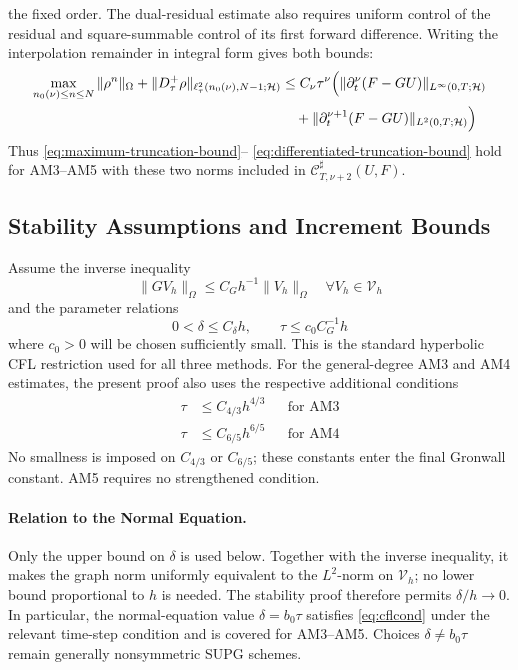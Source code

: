 \documentclass[11pt]{article}
\begin{document}
the fixed order. The dual-residual estimate also requires uniform control of
the residual and square-summable control of its first forward difference.
Writing the interpolation remainder in integral form gives both bounds:
\begin{align}
\max_{n_0(\nu)\le n\le N}\|\rho^n\|_{\Omega}
+\|D_{\tau}^{+}\rho\|_{
\ell_{\tau}^2(n_0(\nu),N-1;\mathcal H)}
&\le C_\nu\tau^\nu\Bigl(
\|\partial_t^\nu(F-GU)\|_{L^{\infty}(0,T;\mathcal H)}
\label{eq:am-differentiated-consistency-main}\\
&\quad+\|\partial_t^{\nu+1}(F-GU)\|_{L^2(0,T;\mathcal H)}\Bigr)
\label{eq:am-differentiated-consistency-derivative}
\end{align}
Thus \eqref{eq:maximum-truncation-bound}--
\eqref{eq:differentiated-truncation-bound} hold for AM3--AM5 with these
two norms included in \(\mathcal C^{\sharp}_{T,\nu+2}(U,F)\).


\subsection{Stability Assumptions and Increment Bounds}
\label{subsec:adams-stability-assumptions}
Assume the inverse inequality
\begin{equation}
\|GV_h\|_{\Omega}\le C_Gh^{-1}\|V_h\|_{\Omega}
\quad \forall V_h\in\mathcal V_h \label{eq:adams-inverse-inequality}
\end{equation}
and the parameter relations
\begin{equation}
0<\delta\le C_{\delta}h,\qquad
\tau\le c_0C_G^{-1}h \label{eq:cflcond}
\end{equation}
where \(c_0>0\) will be chosen sufficiently small. This is the standard
hyperbolic CFL restriction used for all three methods. For the general-degree
AM3 and AM4 estimates, the present proof also uses the respective additional
conditions
\begin{align}
\tau&\le C_{4/3}h^{4/3} &&\text{for AM3} \label{eq:am3-strengthened-cfl}\\
\tau&\le C_{6/5}h^{6/5} &&\text{for AM4} \label{eq:am4-strengthened-cfl}
\end{align}
No smallness is imposed on \(C_{4/3}\) or \(C_{6/5}\); these constants enter
the final Gronwall constant. AM5 requires no strengthened condition.

\paragraph{Relation to the Normal Equation.}
Only the upper bound on \(\delta\) is used below. Together with the inverse
inequality, it makes the graph norm uniformly equivalent to the
\(L^2\)-norm on \(\mathcal V_h\); no lower bound proportional to \(h\) is
needed. The stability proof therefore permits \(\delta/h\to0\). In
particular, the normal-equation value \(\delta=b_0\tau\) satisfies
\eqref{eq:cflcond} under the relevant time-step condition and is covered for
AM3--AM5. Choices \(\delta\ne b_0\tau\) remain generally nonsymmetric SUPG
schemes.
\end{document}
